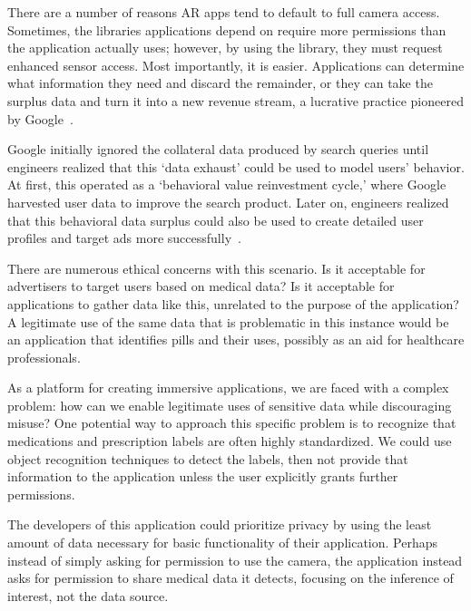 There are a number of reasons AR apps tend to default to full camera access. Sometimes, the libraries applications depend on require more permissions than the application actually uses; however, by using the library, they must request enhanced sensor access. Most importantly, it is easier. Applications can determine what information they need and discard the remainder, or they can take the surplus data and turn it into a new revenue stream, a lucrative practice pioneered by Google~\cite{zuboff2019age}.

Google initially ignored the collateral data produced by search queries until engineers realized that this `data exhaust' could be used to model users' behavior. At first, this operated as a `behavioral value reinvestment cycle,' where Google harvested user data to improve the search product. Later on, engineers realized that this behavioral data surplus could also be used to create detailed user profiles and target ads more successfully~\cite{patent2003targetedad}.

There are numerous ethical concerns with this scenario. Is it acceptable for advertisers to target users based on medical data? Is it acceptable for applications to gather data like this, unrelated to the purpose of the application?  A legitimate use of the same data that is problematic in this instance would be an application that identifies pills and their uses, possibly as an aid for healthcare professionals.

As a platform for creating immersive applications, we are faced with a complex problem: how can we enable legitimate uses of sensitive data while discouraging misuse? One potential way to approach this specific problem is to recognize that medications and prescription labels are often highly standardized. We could use object recognition techniques to detect the labels, then not provide that information to the application unless the user explicitly grants further permissions.


The developers of this application could prioritize privacy by using the least amount of data necessary for basic functionality of their application. Perhaps instead of simply asking for permission to use the camera, the application instead asks for permission to share medical data it detects, focusing on the inference of interest, not the data source.


